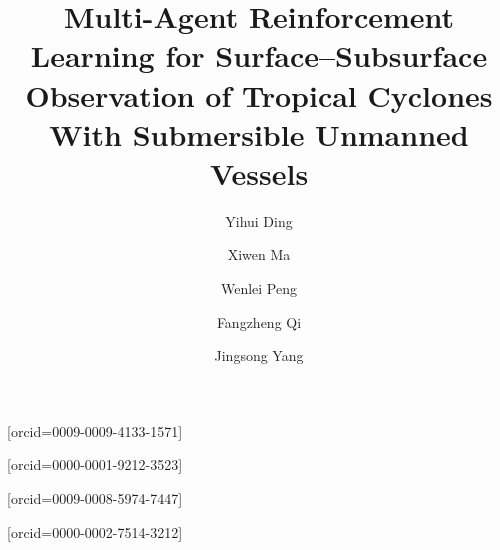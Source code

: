 \documentclass[a4paper,fleqn]{cas-dc}
\begin{document}
\let\WriteBookmarks\relax
\def\floatpagepagefraction{1}
\def\textpagefraction{.001}

\title [mode = title]{%
\texorpdfstring{Multi-Agent Reinforcement Learning for
Surface--Subsurface Observation of Tropical Cyclones With Submersible
Unmanned Vessels}%
{Multi-Agent Reinforcement Learning for Surface--Subsurface Observation of
Tropical Cyclones With Submersible Unmanned Vessels}}





\author[1,2]{Yihui Ding}[orcid=0009-0009-4133-1571]
\fnmark[1] %
\author[1,2,3]{\hspace*{0.33em}Xiwen Ma}[orcid=0000-0001-9212-3523]
\fnmark[1] %
\author[1,2]{\hspace*{0.33em}Wenlei Peng}
\author[1,2]{\hspace*{0.33em}Fangzheng Qi}[orcid=0009-0008-5974-7447]
\author[1,2,4]{\hspace*{0.33em}Jingsong Yang}[orcid=0000-0002-7514-3212]
\cormark[1]

\address[1]{School of Oceanography, Shanghai Jiao Tong University, Shanghai, 200030, China}
\address[2]{State Key Laboratory of Satellite Ocean Environment Dynamics, Second Institute of Oceanography, Ministry of Natural Resources, Hangzhou, 310012, China}
\address[3]{Institute of Automation Chinese Academy of Sciences, Beijing, 100190, China}
\address[4]{Southern Marine Science and Engineering Guangdong Laboratory, Zhuhai, 519082, China}
\end{document}
